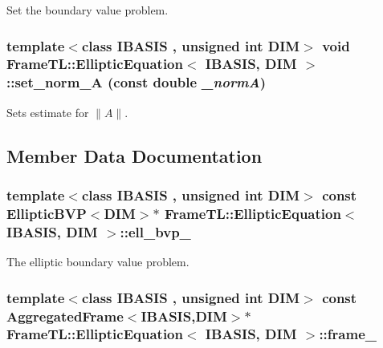 Set the boundary value problem. \hypertarget{classFrameTL_1_1EllipticEquation_324bc7e2d2cc5a9e51fa6da305dae04b}{
\subsubsection[{set\_\-norm\_\-A}]{\setlength{\rightskip}{0pt plus 5cm}template$<$class IBASIS , unsigned int DIM$>$ void {\bf FrameTL::EllipticEquation}$<$ IBASIS, DIM $>$::set\_\-norm\_\-A (const double {\em \_\-normA})}}
\label{classFrameTL_1_1EllipticEquation_324bc7e2d2cc5a9e51fa6da305dae04b}


Sets estimate for $\|A\|$. 

\subsection{Member Data Documentation}
\hypertarget{classFrameTL_1_1EllipticEquation_998a091c1b338f3af2ca837a5f92cdc6}{
\subsubsection[{ell\_\-bvp\_\-}]{\setlength{\rightskip}{0pt plus 5cm}template$<$class IBASIS , unsigned int DIM$>$ const EllipticBVP$<$DIM$>$$\ast$ {\bf FrameTL::EllipticEquation}$<$ IBASIS, DIM $>$::{\bf ell\_\-bvp\_\-}}}
\label{classFrameTL_1_1EllipticEquation_998a091c1b338f3af2ca837a5f92cdc6}


The elliptic boundary value problem. \hypertarget{classFrameTL_1_1EllipticEquation_c6cfc9f98e124563a81a3e1da08de95e}{
\subsubsection[{frame\_\-}]{\setlength{\rightskip}{0pt plus 5cm}template$<$class IBASIS , unsigned int DIM$>$ const {\bf AggregatedFrame}$<$IBASIS,DIM$>$$\ast$ {\bf FrameTL::EllipticEquation}$<$ IBASIS, DIM $>$::{\bf frame\_\-}}}
\label{classFrameTL_1_1EllipticEquation_c6cfc9f98e124563a81a3e1da08de95e}


